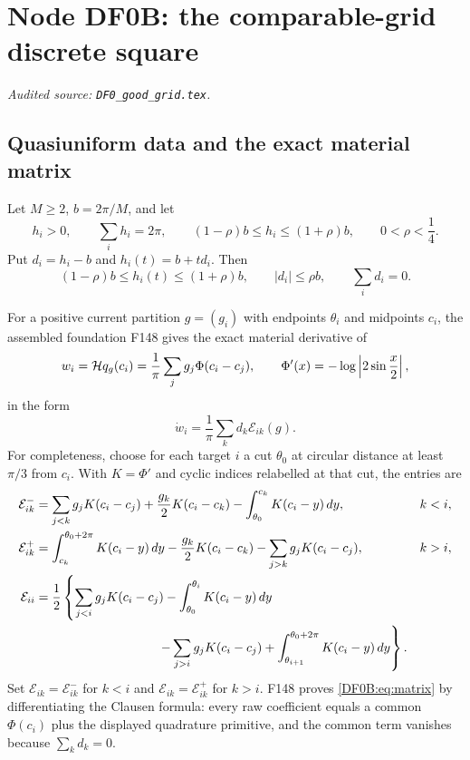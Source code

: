 \begingroup
\section{Node DF0B: the comparable-grid discrete square}
\label{module:DF0B}
\noindent\textit{Audited source: \nolinkurl{DF0_good_grid.tex}.}
\subsection{Quasiuniform data and the exact material matrix}

Let $M\ge2$, $b=2\pi/M$, and let
\begin{equation}\label{DF0B:eq:quasi}
 h_i>0,\qquad \sum_i h_i=2\pi,
 \qquad (1-\rho)b\le h_i\le(1+\rho)b,
 \qquad 0<\rho<\frac14.
\end{equation}
Put $d_i=h_i-b$ and $h_i(t)=b+td_i$.  Then
\begin{equation}\label{DF0B:eq:path-quasi}
 (1-\rho)b\le h_i(t)\le(1+\rho)b,
 \qquad |d_i|\le\rho b,\qquad \sum_i d_i=0.
\end{equation}

For a positive current partition $g=(g_i)$ with endpoints $\theta_i$ and
midpoints $c_i$, the assembled foundation F148 gives the exact material
derivative of
\begin{equation}\label{DF0B:eq:w}
 w_i=\mathcal H q_g(c_i)=\frac1\pi\sum_jg_j\Phi(c_i-c_j),
 \qquad \Phi'(x)=-\log\left|2\sin\frac x2\right|,
\end{equation}
in the form
\begin{equation}\label{DF0B:eq:matrix}
 \dot w_i=\frac1\pi\sum_kd_k\mathcal E_{ik}(g).
\end{equation}
For completeness, choose for each target $i$ a cut $\theta_0$ at circular
distance at least $\pi/3$ from $c_i$.  With
$K=\Phi'$ and cyclic indices relabelled at that cut, the entries are
\begin{align}
 \mathcal E_{ik}^-&=
 \sum_{j<k}g_jK(c_i-c_j)+\frac{g_k}{2}K(c_i-c_k)
 -\int_{\theta_0}^{c_k}K(c_i-y)\,dy, &&k<i,\notag\\
 \mathcal E_{ik}^+&=
 \int_{c_k}^{\theta_0+2\pi}K(c_i-y)\,dy
 -\frac{g_k}{2}K(c_i-c_k)-\sum_{j>k}g_jK(c_i-c_j), &&k>i,
 \label{DF0B:eq:E-explicit}\\
 \mathcal E_{ii}&=\frac12\left\{
 \sum_{j<i}g_jK(c_i-c_j)-\int_{\theta_0}^{\theta_i}K(c_i-y)\,dy
 \right.\notag\\
 &\hspace{34mm}\left.
 -\sum_{j>i}g_jK(c_i-c_j)
 +\int_{\theta_{i+1}}^{\theta_0+2\pi}K(c_i-y)\,dy
 \right\}.\notag
\end{align}
Set $\mathcal E_{ik}=\mathcal E_{ik}^-$ for $k<i$ and
$\mathcal E_{ik}=\mathcal E_{ik}^+$ for $k>i$.  F148 proves
\eqref{DF0B:eq:matrix} by differentiating the Clausen formula: every raw
coefficient equals a common $\Phi(c_i)$ plus the displayed quadrature
primitive, and the common term vanishes because $\sum_kd_k=0$.

